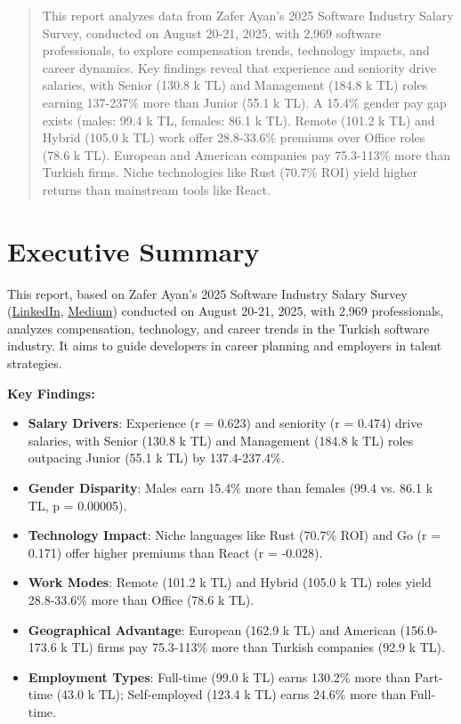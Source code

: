 \documentclass[12pt,a4paper]{article}
\begin{document}
\maketitle

\tableofcontents
\newpage

\begin{abstract}
This report analyzes data from Zafer Ayan’s 2025 Software Industry Salary Survey, conducted on August 20-21, 2025, with 2,969 software professionals, to explore compensation trends, technology impacts, and career dynamics. Key findings reveal that experience and seniority drive salaries, with Senior (130.8 k TL) and Management (184.8 k TL) roles earning 137-237\% more than Junior (55.1 k TL). A 15.4\% gender pay gap exists (males: 99.4 k TL, females: 86.1 k TL). Remote (101.2 k TL) and Hybrid (105.0 k TL) work offer 28.8-33.6\% premiums over Office roles (78.6 k TL). European and American companies pay 75.3-113\% more than Turkish firms. Niche technologies like Rust (70.7\% ROI) yield higher returns than mainstream tools like React. 
\end{abstract}

\section{Executive Summary}

This report, based on Zafer Ayan’s 2025 Software Industry Salary Survey (\href{https://www.linkedin.com/posts/zaferayan_geleneksel-maa%C5%9F-anketi-buyrun-httpslnkdin-activity-7363866008664629248-7YcQ}{LinkedIn}, \href{https://zaferayan.medium.com/2025-a%C4%9Fustos-detayl%C4%B1-maa%C5%9F-anketi-98446d71920a}{Medium}) conducted on August 20-21, 2025, with 2,969 professionals, analyzes compensation, technology, and career trends in the Turkish software industry. It aims to guide developers in career planning and employers in talent strategies.

\textbf{Key Findings:}
\begin{itemize}
    \item \textbf{Salary Drivers}: Experience (r = 0.623) and seniority (r = 0.474) drive salaries, with Senior (130.8 k TL) and Management (184.8 k TL) roles outpacing Junior (55.1 k TL) by 137.4-237.4\%.
    \item \textbf{Gender Disparity}: Males earn 15.4\% more than females (99.4 vs. 86.1 k TL, p = 0.00005).
    \item \textbf{Technology Impact}: Niche languages like Rust (70.7\% ROI) and Go (r = 0.171) offer higher premiums than React (r = -0.028).
    \item \textbf{Work Modes}: Remote (101.2 k TL) and Hybrid (105.0 k TL) roles yield 28.8-33.6\% more than Office (78.6 k TL).
    \item \textbf{Geographical Advantage}: European (162.9 k TL) and American (156.0-173.6 k TL) firms pay 75.3-113\% more than Turkish companies (92.9 k TL).
    \item \textbf{Employment Types}: Full-time (99.0 k TL) earns 130.2\% more than Part-time (43.0 k TL); Self-employed (123.4 k TL) earns 24.6\% more than Full-time.
\end{itemize}
\end{document}
